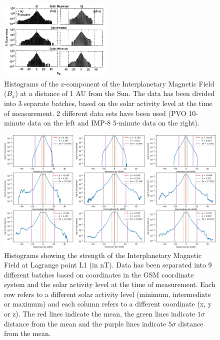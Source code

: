 \documentclass[11pt]{article}
\begin{document}
        \begin{figure}[t!]
            \centering
            \includegraphics[width=0.48\textwidth]{fig_introduction/russellBZ.png}
            \caption{Histograms of the z-component of the Interplanetary Magnetic Field ($B_x$) at a distance of 1 AU from the Sun\cite{2001russell}. The data has been divided into 3 separate batches, based on the solar activity level at the time of measurement. 2 different data sets have been used (PVO 10-minute data on the left and IMP-8 5-minute data on the right).}
            \label{fig:russellBZ}
        \end{figure}
        \begin{figure}[t!]
            \centering
            \includegraphics[width=\textwidth]{fig_introduction/hist_imf_strength.png}
            \caption{Histograms showing the strength of the Interplanetary Magnetic Field at Lagrange point L1 (in nT). Data has been separated into 9 different batches based on coordinates in the GSM coordinate system and the solar activity level at the time of measurement. Each row refers to a different solar activity level (minimum, intermediate or maximum) and each column refers to a different coordinate (x, y or z). The red lines indicate the mean, the green lines indicate $1\sigma$ distance from the mean and the purple lines indicate $5\sigma$ distance from the mean.}
            \label{fig:hist_imf}
        \end{figure}
\end{document}
